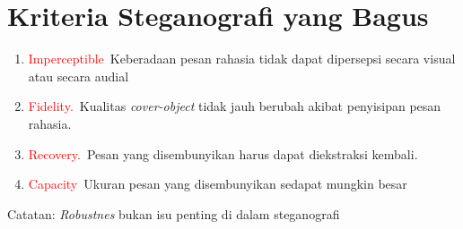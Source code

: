 \documentclass{article}
\begin{document}

\section*{Kriteria Steganografi yang Bagus}

\begin{enumerate}
    \item \textcolor{red}{Imperceptible}\
    Keberadaan pesan rahasia tidak dapat dipersepsi secara visual atau secara audial
    \item \textcolor{red}{Fidelity.}\
    Kualitas \textit{cover-object} tidak jauh berubah akibat penyisipan pesan rahasia.
    \item \textcolor{red}{Recovery.}\
    Pesan yang disembunyikan harus dapat diekstraksi kembali.
    \item \textcolor{red}{Capacity}\
    Ukuran pesan yang disembunyikan sedapat mungkin besar
\end{enumerate}

\noindent Catatan: \textit{Robustnes} bukan isu penting di dalam steganografi
\end{document}
